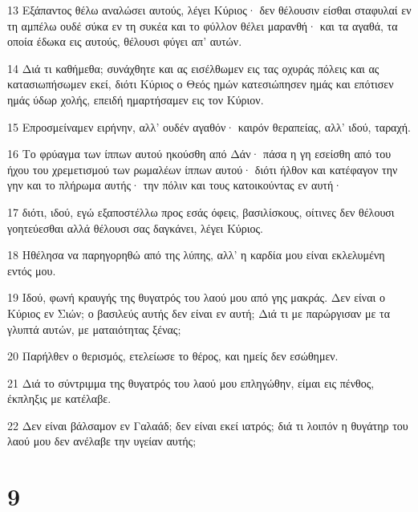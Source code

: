 \par 13 Εξάπαντος θέλω αναλώσει αυτούς, λέγει Κύριος· δεν θέλουσιν είσθαι σταφυλαί εν τη αμπέλω ουδέ σύκα εν τη συκέα και το φύλλον θέλει μαρανθή· και τα αγαθά, τα οποία έδωκα εις αυτούς, θέλουσι φύγει απ' αυτών.
\par 14 Διά τι καθήμεθα; συνάχθητε και ας εισέλθωμεν εις τας οχυράς πόλεις και ας κατασιωπήσωμεν εκεί, διότι Κύριος ο Θεός ημών κατεσιώπησεν ημάς και επότισεν ημάς ύδωρ χολής, επειδή ημαρτήσαμεν εις τον Κύριον.
\par 15 Επροσμείναμεν ειρήνην, αλλ' ουδέν αγαθόν· καιρόν θεραπείας, αλλ' ιδού, ταραχή.
\par 16 Το φρύαγμα των ίππων αυτού ηκούσθη από Δάν· πάσα η γη εσείσθη από του ήχου του χρεμετισμού των ρωμαλέων ίππων αυτού· διότι ήλθον και κατέφαγον την γην και το πλήρωμα αυτής· την πόλιν και τους κατοικούντας εν αυτή·
\par 17 διότι, ιδού, εγώ εξαποστέλλω προς εσάς όφεις, βασιλίσκους, οίτινες δεν θέλουσι γοητεύεσθαι αλλά θέλουσι σας δαγκάνει, λέγει Κύριος.
\par 18 Ηθέλησα να παρηγορηθώ από της λύπης, αλλ' η καρδία μου είναι εκλελυμένη εντός μου.
\par 19 Ιδού, φωνή κραυγής της θυγατρός του λαού μου από γης μακράς. Δεν είναι ο Κύριος εν Σιών; ο βασιλεύς αυτής δεν είναι εν αυτή; Διά τι με παρώργισαν με τα γλυπτά αυτών, με ματαιότητας ξένας;
\par 20 Παρήλθεν ο θερισμός, ετελείωσε το θέρος, και ημείς δεν εσώθημεν.
\par 21 Διά το σύντριμμα της θυγατρός του λαού μου επληγώθην, είμαι εις πένθος, έκπληξις με κατέλαβε.
\par 22 Δεν είναι βάλσαμον εν Γαλαάδ; δεν είναι εκεί ιατρός; διά τι λοιπόν η θυγάτηρ του λαού μου δεν ανέλαβε την υγείαν αυτής;

\chapter{9}

